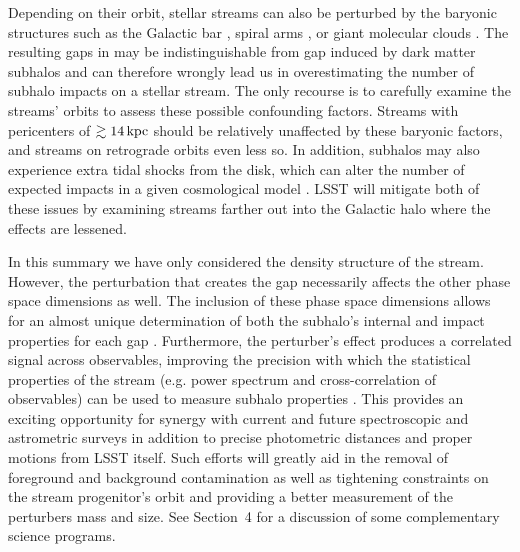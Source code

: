 \documentclass[modern,linenumbers]{aastex62}
\begin{document}
Depending on their orbit, stellar streams can also be perturbed by the baryonic structures such as the Galactic bar \citep[e.g.][]{erkal2017,pearson2017}, spiral arms \citep{Banik2018}, or giant molecular clouds \citep{amorisco2016}. The resulting gaps in may be indistinguishable from gap induced by dark matter subhalos and can therefore wrongly lead us in overestimating the number of subhalo impacts on a stellar stream. The only recourse is to carefully examine the streams' orbits to assess these possible confounding factors. Streams with pericenters of $\gtrsim 14\mathrm{\,kpc}$ should be relatively unaffected by these baryonic factors, and streams on retrograde orbits even less so. In addition, subhalos may also experience extra tidal shocks from the disk, which can alter the number of expected impacts in a given cosmological model \citep[e.g.][]{DOnghia2010,Garrison-Kimmel2017}. LSST will mitigate both of these issues by examining streams farther out into the Galactic halo where the effects are lessened.

In this summary we have only considered the density structure of the stream. However, the perturbation that creates the gap necessarily affects the other phase space dimensions as well. The inclusion of these phase space dimensions allows for an almost unique determination of both the subhalo's internal and impact properties for each gap \citep{erkal2015b}. Furthermore, the perturber's effect produces a correlated signal across observables, improving the precision with which the statistical properties of the stream (e.g. power spectrum and cross-correlation of observables) can be used to measure subhalo properties \citep{bovy:2017}. This provides an exciting opportunity for synergy with current and future spectroscopic and astrometric surveys in addition to precise photometric distances and proper motions from LSST itself. Such efforts will greatly aid in the removal of foreground and background contamination as well as tightening constraints on the stream progenitor's orbit and providing a better measurement of the perturbers mass and size. See Section~4 for a discussion of some complementary science programs.

\end{document}

